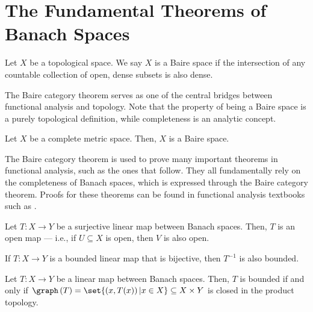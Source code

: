 \section{The Fundamental Theorems of Banach Spaces}%
\begin{definition}
  Let $X$ be a topological space. We say $X$ is a Baire space if the intersection of any countable collection of open, dense subsets is also dense.
\end{definition}
The Baire category theorem serves as one of the central bridges between functional analysis and topology. Note that the property of being a Baire space is a purely topological definition, while completeness is an analytic concept.
\begin{theorem}\label{thm:baire}
  Let $X$ be a complete metric space. Then, $X$ is a Baire space.
\end{theorem}
The Baire category theorem is used to prove many important theorems in functional analysis, such as the ones that follow. They all fundamentally rely on the completeness of Banach spaces, which is expressed through the Baire category theorem. Proofs for these theorems can be found in functional analysis textbooks such as \cite{rudin_functional_analysis}.
\begin{theorem}\label{thm:open_mapping}
  Let $T\colon X\rightarrow Y$ be a surjective linear map between Banach spaces. Then, $T$ is an open map --- i.e., if $U\subseteq X$ is open, then $V$ is also open.
\end{theorem}
\begin{corollary}\label{cor:bounded_inverse}
  If $T\colon X\rightarrow Y$ is a bounded linear map that is bijective, then $T^{-1}$ is also bounded.
\end{corollary}
\begin{theorem}\label{thm:closed_graph}
  Let $T\colon X\rightarrow Y$ be a linear map between Banach spaces. Then, $T$ is bounded if and only if $\graph\left(T\right) = \set{\left(x,T(x)\right)| x\in X} \subseteq X\times Y$ is closed in the product topology.
\end{theorem}
